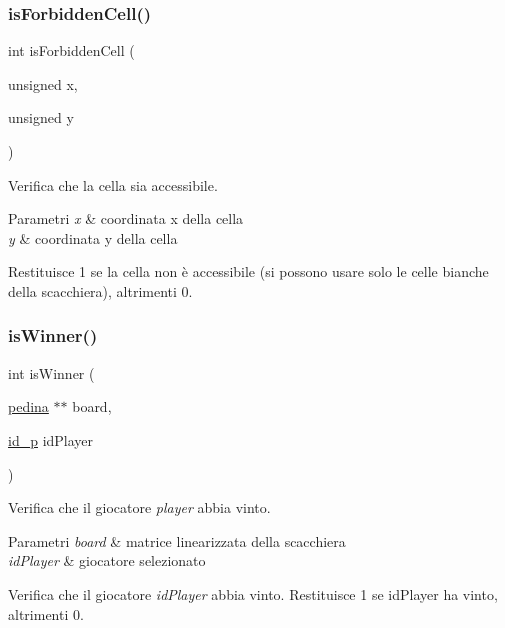 \subsubsection{\texorpdfstring{is\+Forbidden\+Cell()}{isForbiddenCell()}}
{\footnotesize\ttfamily int is\+Forbidden\+Cell (\begin{DoxyParamCaption}\item[{unsigned}]{x,  }\item[{unsigned}]{y }\end{DoxyParamCaption})}



Verifica che la cella sia accessibile. 


\begin{DoxyParams}{Parametri}
{\em x} & coordinata x della cella \\
\hline
{\em y} & coordinata y della cella\\
\hline
\end{DoxyParams}
Restituisce 1 se la cella non è accessibile (si possono usare solo le celle bianche della scacchiera), altrimenti 0. \mbox{\label{group__Logiche_ga0b5b57b74dd64318663e80224db22a29}} 
\subsubsection{\texorpdfstring{is\+Winner()}{isWinner()}}
{\footnotesize\ttfamily int is\+Winner (\begin{DoxyParamCaption}\item[{\hyperlink{ml__lib_8h_a71fee95122b31f5cb0b07d9c16ffa3a5}{pedina} $\ast$$\ast$}]{board,  }\item[{\hyperlink{ml__lib_8h_a0330ff92cbc796e96c3ce3e4401bf1e1}{id\+\_\+p}}]{id\+Player }\end{DoxyParamCaption})}



Verifica che il giocatore {\itshape player} abbia vinto. 


\begin{DoxyParams}{Parametri}
{\em board} & matrice linearizzata della scacchiera \\
\hline
{\em id\+Player} & giocatore selezionato\\
\hline
\end{DoxyParams}
Verifica che il giocatore {\itshape id\+Player} abbia vinto. Restituisce 1 se id\+Player ha vinto, altrimenti 0. \mbox{\label{group__Logiche_ga52af2f129ce1f4939cc325823601f413}} 
